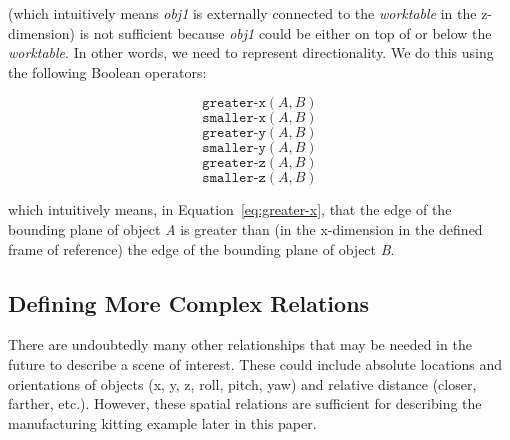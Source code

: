 \documentclass[final,1p,times]{elsarticle}
\newcommand{\obj}[1] {\textit{#1}}
\begin{document}
(which intuitively means \obj{obj1} is externally connected to the \obj{worktable} in the z-dimension) is not sufficient because \obj{obj1} could be either on top of or below the \obj{worktable}. In other words, we need to represent directionality. We do this using the following Boolean operators:

\begin{equation}\label{eq:greater-x}
\texttt{greater-x}(\textit{A}, \textit{B})
\end{equation}
\begin{equation}\label{eq:smaller-x}
\texttt{smaller-x}(\textit{A}, \textit{B})
\end{equation}
\begin{equation}\label{eq:greater-y}
\texttt{greater-y}(\textit{A}, \textit{B})
\end{equation}
\begin{equation}\label{eq:smaller-y}
\texttt{smaller-y}(\textit{A}, \textit{B})
\end{equation}
\begin{equation}\label{eq:greater-z}
\texttt{greater-z}(\textit{A}, \textit{B})
\end{equation}
\begin{equation}\label{eq:smaller-z}
\texttt{smaller-z}(\textit{A}, \textit{B})
\end{equation}

which intuitively means, in Equation~\ref{eq:greater-x}, that the edge of the bounding plane of object \textit{A} is greater than (in the x-dimension in the defined frame of reference) the edge of the bounding plane of object \textit{B}.

\subsection{Defining More Complex Relations}
There are undoubtedly many other relationships that may be needed in the future to describe a scene of interest. These could include absolute locations and orientations of objects (x, y, z, roll, pitch, yaw) and relative distance (closer, farther, etc.). However, these spatial relations are sufficient for describing the manufacturing kitting example later in this paper.
\end{document}
